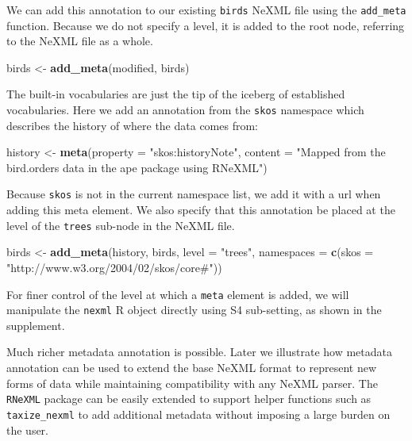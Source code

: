 \documentclass[author-year, review, 11pt]{components/elsarticle} %
\newenvironment{Shaded}{\begin{snugshade}}{\end{snugshade}}
\newcommand{\KeywordTok}[1]{\textcolor[rgb]{0.13,0.29,0.53}{\textbf{{#1}}}}
\newcommand{\DataTypeTok}[1]{\textcolor[rgb]{0.13,0.29,0.53}{{#1}}}
\newcommand{\StringTok}[1]{\textcolor[rgb]{0.31,0.60,0.02}{{#1}}}
\newcommand{\NormalTok}[1]{{#1}}
\begin{document}
We can add this annotation to our existing \texttt{birds} NeXML file
using the \texttt{add\_meta} function. Because we do not specify a
level, it is added to the root node, referring to the NeXML file as a
whole.

\begin{Shaded}
\begin{Highlighting}[]
\NormalTok{birds <-}\StringTok{ }\KeywordTok{add_meta}\NormalTok{(modified, birds) }
\end{Highlighting}
\end{Shaded}

The built-in vocabularies are just the tip of the iceberg of established
vocabularies. Here we add an annotation from the \texttt{skos} namespace
which describes the history of where the data comes from:

\begin{Shaded}
\begin{Highlighting}[]
\NormalTok{history <-}\StringTok{ }\KeywordTok{meta}\NormalTok{(}\DataTypeTok{property =} \StringTok{"skos:historyNote"}\NormalTok{,}
  \DataTypeTok{content =} \StringTok{"Mapped from the bird.orders data in the ape package using RNeXML"}\NormalTok{)}
\end{Highlighting}
\end{Shaded}

Because \texttt{skos} is not in the current namespace list, we add it
with a url when adding this meta element. We also specify that this
annotation be placed at the level of the \texttt{trees} sub-node in the
NeXML file.

\begin{Shaded}
\begin{Highlighting}[]
\NormalTok{birds <-}\StringTok{ }\KeywordTok{add_meta}\NormalTok{(history, }
                \NormalTok{birds, }
                \DataTypeTok{level =} \StringTok{"trees"}\NormalTok{,}
                \DataTypeTok{namespaces =} \KeywordTok{c}\NormalTok{(}\DataTypeTok{skos =} \StringTok{"http://www.w3.org/2004/02/skos/core#"}\NormalTok{))}
\end{Highlighting}
\end{Shaded}

For finer control of the level at which a \texttt{meta} element is
added, we will manipulate the \texttt{nexml} R object directly using S4
sub-setting, as shown in the supplement.

Much richer metadata annotation is possible. Later we illustrate how
metadata annotation can be used to extend the base NeXML format to
represent new forms of data while maintaining compatibility with any
NeXML parser. The \texttt{RNeXML} package can be easily extended to
support helper functions such as \texttt{taxize\_nexml} to add
additional metadata without imposing a large burden on the user.
\end{document}
